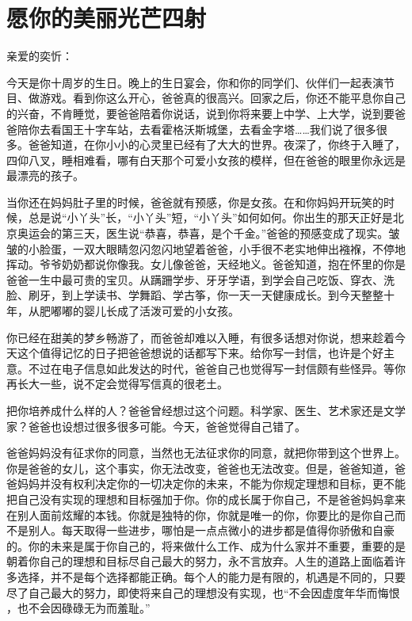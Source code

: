 \chapter{愿你的美丽光芒四射}

\noindent 亲爱的奕忻：

\mbox{}

今天是你十周岁的生日。晚上的生日宴会，你和你的同学们、伙伴们一起表演节目、做游戏。看到你这么开心，爸爸真的很高兴。回家之后，你还不能平息你自己的兴奋，不肯睡觉，要爸爸陪着你说话，说到你将来要上中学、上大学，说到要爸爸陪你去看国王十字车站，去看霍格沃斯城堡，去看金字塔……我们说了很多很多。爸爸知道，在你小小的心灵里已经有了大大的世界。夜深了，你终于入睡了，四仰八叉，睡相难看，哪有白天那个可爱小女孩的模样，但在爸爸的眼里你永远是最漂亮的孩子。

当你还在妈妈肚子里的时候，爸爸就有预感，你是女孩。在和你妈妈开玩笑的时候，总是说“小丫头”长，“小丫头”短，“小丫头”如何如何。你出生的那天正好是北京奥运会的第三天，医生说“恭喜，恭喜，是个千金。”爸爸的预感变成了现实。皱皱的小脸蛋，一双大眼睛忽闪忽闪地望着爸爸，小手很不老实地伸出襁褓，不停地挥动。爷爷奶奶都说你像我。女儿像爸爸，天经地义。爸爸知道，抱在怀里的你是爸爸一生中最可贵的宝贝。从蹒跚学步、牙牙学语，到学会自己吃饭、穿衣、洗脸、刷牙，到上学读书、学舞蹈、学古筝，你一天一天健康成长。到今天整整十年，从肥嘟嘟的婴儿长成了活泼可爱的小女孩。

你已经在甜美的梦乡畅游了，而爸爸却难以入睡，有很多话想对你说，想来趁着今天这个值得记忆的日子把爸爸想说的话都写下来。给你写一封信，也许是个好主意。不过在电子信息如此发达的时代，爸爸自己也觉得写一封信颇有些怪异。等你再长大一些，说不定会觉得写信真的很老土。

把你培养成什么样的人？爸爸曾经想过这个问题。科学家、医生、艺术家还是文学家？爸爸也设想过很多很多可能。今天，爸爸觉得自己错了。

爸爸妈妈没有征求你的同意，当然也无法征求你的同意，就把你带到这个世界上。你是爸爸的女儿，这个事实，你无法改变，爸爸也无法改变。但是，爸爸知道，爸爸妈妈并没有权利决定你的一切决定你的未来，不能为你规定理想和目标，更不能把自己没有实现的理想和目标强加于你。你的成长属于你自己，不是爸爸妈妈拿来在别人面前炫耀的本钱。你就是独特的你，你就是唯一的你，你要比的是你自己而不是别人。每天取得一些进步，哪怕是一点点微小的进步都是值得你骄傲和自豪的。你的未来是属于你自己的，将来做什么工作、成为什么家并不重要，重要的是朝着你自己的理想和目标尽自己最大的努力，永不言放弃。人生的道路上面临着许多选择，并不是每个选择都能正确。每个人的能力是有限的，机遇是不同的，只要尽了自己最大的努力，即使将来自己的理想没有实现，也“不会因虚度年华而悔恨 ，也不会因碌碌无为而羞耻。”

